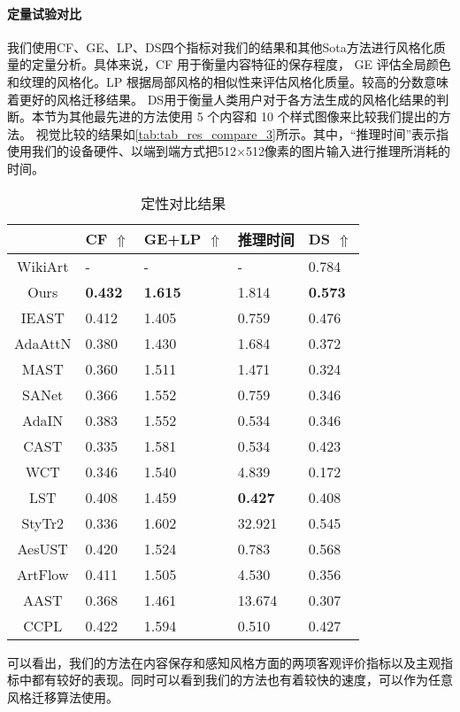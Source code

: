 \paragraph{定量试验对比}
我们使用CF、GE、LP、DS四个指标对我们的结果和其他Sota方法进行风格化质量的定量分析。具体来说，CF 用于衡量内容特征的保存程度，
GE 评估全局颜色和纹理的风格化。LP 根据局部风格的相似性来评估风格化质量。较高的分数意味着更好的风格迁移结果。
DS用于衡量人类用户对于各方法生成的风格化结果的判断。本节为其他最先进的方法使用 5 个内容和 10 个样式图像来比较我们提出的方法。
视觉比较的结果如\autoref{tab:tab_res_compare_3}所示。其中，“推理时间”表示指使用我们的设备硬件、以端到端方式把512$\times$512像素的图片输入进行推理所消耗的时间。
\begin{table}[htbp]
    \centering
    \caption{定性对比结果}
    \label{tab:tab_res_compare_3}
    \begin{tabularx}{\textwidth}{c|X<{\centering}|X<{\centering}|X<{\centering}|X<{\centering}}
        \hline
        & CF $\Uparrow$ & GE+LP $\Uparrow$ & 推理时间 & DS $\Uparrow$ \\ \hline
        WikiArt & - & - & - & 0.784 \\ \hline
        Ours & \textbf{0.432} & \textbf{1.615} & 1.814 & \textbf{0.573} \\ \hline
        IEAST & 0.412 & 1.405 & 0.759 & 0.476 \\ \hline
        AdaAttN & 0.380 & 1.430 & 1.684 & 0.372 \\ \hline
        MAST & 0.360 & 1.511 & 1.471 & 0.324 \\ \hline
        SANet & 0.366 & 1.552 & 0.759 & 0.346 \\ \hline
        AdaIN & 0.383 & 1.552 & 0.534 & 0.346 \\ \hline
        CAST & 0.335 & 1.581 & 0.534 & 0.423 \\ \hline
        WCT & 0.346 & 1.540 & 4.839 & 0.172 \\ \hline
        LST & 0.408 & 1.459 & \textbf{0.427} & 0.408 \\ \hline
        StyTr2 & 0.336 & 1.602 & 32.921 & 0.545 \\ \hline
        AesUST & 0.420 & 1.524 & 0.783 & 0.568 \\ \hline
        ArtFlow & 0.411 & 1.505 & 4.530 & 0.356 \\ \hline
        AAST & 0.368 & 1.461 & 13.674 & 0.307 \\ \hline
        CCPL & 0.422 & 1.594 & 0.510 & 0.427 \\ \hline
    \end{tabularx}
\end{table}
可以看出，我们的方法在内容保存和感知风格方面的两项客观评价指标以及主观指标中都有较好的表现。同时可以看到我们的方法也有着较快的速度，可以作为任意风格迁移算法使用。
